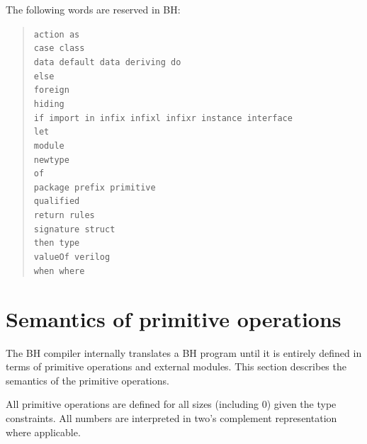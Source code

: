 \documentclass[twoside,letterpaper]{article}
\newcommand{\BH}{BH}
\newcommand{\te}[1]{\texttt{#1}}
\begin{document}
The following words are reserved in {\BH}:
\begin{quote}
\te{action as} \\
\te{case class} \\
\te{data default data deriving do} \\
\te{else} \\
\te{foreign} \\
\te{hiding} \\
\te{if import in infix infixl infixr instance interface} \\
\te{let} \\
\te{module} \\
\te{newtype} \\
\te{of} \\
\te{package prefix primitive} \\
\te{qualified} \\
\te{return rules} \\
\te{signature struct} \\
\te{then type} \\
\te{valueOf verilog} \\
\te{when where}
\end{quote}


\newpage

\section{Semantics of primitive operations}

\label{sec-primitives}

The {\BH} compiler internally translates a {\BH} program until
it is entirely defined in terms of primitive operations and
external modules.  This section describes the semantics of the
primitive operations.

All primitive operations are defined for all sizes (including 0)
given the type constraints.
All numbers are interpreted in two's complement representation
where applicable.
\end{document}
